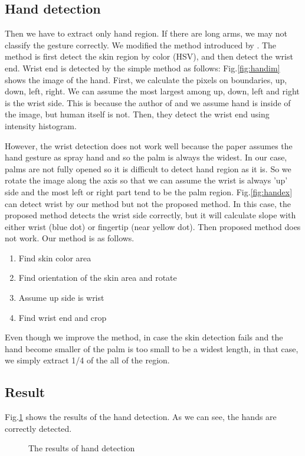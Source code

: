 \subsection{Hand detection}
Then we have to extract only hand region. If there are long arms, we may not classify the gesture correctly. We modified the method introduced by \cite{ra11}. The method is first detect the skin region by color (HSV), and then detect the wrist end. Wrist end is detected by the simple method as follows:
Fig.\ref{fig:handim} shows the image of the hand. First, we calculate the pixels on boundaries, up, down, left, right. 
We can assume the most largest among up, down, left and right is the wrist side. This is because the author of \cite{ra11} and we assume hand is inside of the image, but human itself is not. Then, they detect the wrist end using intensity histogram. 
\par
However, the wrist detection does not work well because the paper assumes the hand gesture as spray hand and so the palm is always the widest. 
In our case, palms are not fully opened so it is difficult to detect hand region as it is. 
So we rotate the image along the axis so that we can assume the wrist is always 'up' side and the most left or right part tend to be the palm region.
Fig.\ref{fig:handex}  can detect wrist by our method but not the proposed method. In this case, the proposed method detects the wrist side correctly, but it will calculate slope with either
wrist (blue dot) or fingertip (near yellow dot). Then proposed method does not work.
Our method is as follows.
\begin{enumerate}
  \item Find skin color area
  \item Find orientation of the skin area and rotate
  \item Assume up side is wrist
  \item Find wrist end and crop
\end{enumerate}
Even though we improve the method, in case the skin detection fails and the hand become smaller of the palm is too small to be a widest length, in that case, we simply extract 1/4 of the all of the region.
\subsection{Result}
Fig.\ref{fig:hands} shows the results of the hand detection.
As we can see, the hands are correctly detected.

\begin{landscape}
\begin{figure}[htbp]
 \centering
 
 \caption{The results of hand detection}
 \label{fig:hands}
\end{figure}
\end{landscape}

